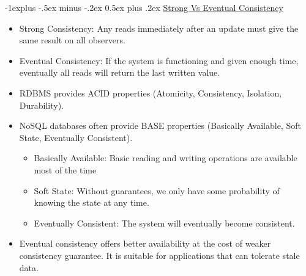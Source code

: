 \documentclass[10pt, landscape]{article}
\makeatletter
\renewcommand{\subsection}{\@startsection{subsection}{2}{0mm}%
  {-1explus -.5ex minus -.2ex}%
  {0.5ex plus .2ex}%
{\normalfont\normalsize\bfseries}}
\makeatother
\begin{document}
\begin{multicols*}{4}
  \subsection{\underline{Strong Vs Eventual Consistency}}
  \begin{itemize}
    \item Strong Consistency: Any reads immediately after an update must give the same result on all observers.
    \item Eventual Consistency: If the system is functioning and given enough time, eventually all reads will return the last written value.
    \item RDBMS provides ACID properties (Atomicity, Consistency, Isolation, Durability).
    \item NoSQL databases often provide BASE properties (Basically Available, Soft State, Eventually Consistent).
    \begin{itemize}
      \item Basically Available: Basic reading and writing operations are available most of the time
      \item Soft State: Without guarantees, we only have some probability of knowing the state at any time.
      \item Eventually Consistent: The system will eventually become consistent.
    \end{itemize}
    \item Eventual consistency offers better availability at the cost of weaker consistency guarantee. It is suitable for applications that can tolerate stale data.
  \end{itemize}


\end{multicols*}
\end{document}
